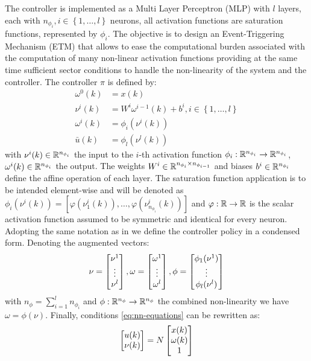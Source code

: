 \documentclass{article}
\begin{document}
The controller is implemented as a Multi Layer Perceptron (MLP) with $l$ layers, each with $n_{\phi_i}, i \in \left\{ 1, \dots, l\right\}$ neurons, all activation functions are saturation functions, represented by $\phi_i$. The objective is to design an Event-Triggering Mechanism (ETM) that allows to ease the computational burden associated with the computation of many non-linear activation functions providing at the same time sufficient sector conditions to handle the non-linearity of the system and the controller. The controller $\pi$ is defined by:
\begin{equation}\label{eq:nn-equations}
  \begin{aligned}
  \omega^{0}(k) &= x(k) \\
  \nu^{i}(k) &= W^{i} \omega^{i - 1}(k) + b^{i}, i \in \left\{ 1, \dots, l \right\}\\
  \omega^{i}(k) &= \phi_i(\nu^i(k))\\
  \bar{u}(k) &= \phi_l(\nu^l(k))
  \end{aligned} 
\end{equation}
with $\nu^i(k) \in {\mathbb{R}}^{n_{\phi_i}}$ the input to the $i$-th activation function $\phi_i: {\mathbb{R}}^{n_{\phi_i}} \to {\mathbb{R}}^{n_{\phi_i}}$, $\omega^i(k) \in {\mathbb{R}}^{n_{\phi_i}}$ the output. The weights $W^i \in {\mathbb{R}}^{n_{\phi_i} \times n_{\phi_{i-1}}}$ and biases $b^i \in {\mathbb{R}}^{n_{\phi_i}}$ define the affine operation of each layer. The saturation function application is to be intended element-wise and will be denoted as $\phi_i(\nu^i(k)) = \left[ \varphi(\nu^i_1(k)), \dots, \varphi(\nu^i_{n_{\phi_i}}(k)) \right]$ and $\varphi: {\mathbb{R}} \to {\mathbb{R}}$ is the scalar activation function assumed to be symmetric and identical for every neuron. Adopting the same notation as in \cite{css-paper} we define the controller policy in a condensed form. Denoting the augmented vectors:
\begin{equation*}
  \nu = \left[\begin{matrix}\nu^1 \\ \vdots \\ \nu^l\end{matrix}\right], \omega = \left[\begin{matrix}\omega^1 \\ \vdots \\ \omega^l\end{matrix}\right], \phi = \left[\begin{matrix}\phi_1(\nu^1) \\ \vdots \\ \phi_l(\nu^l)\end{matrix}\right] 
\end{equation*}
with $n_{\phi} = \sum_{i=1}^{l} n_{\phi_i}$ and $\phi: {\mathbb{R}}^{n_{\phi}} \to {\mathbb{R}}^{n_{\phi}}$ the combined non-linearity we have $\omega = \phi(\nu)$. Finally, conditions \ref{eq:nn-equations} can be rewritten as:
\begin{equation*}
  \left[\begin{matrix}u(k)\\ \nu(k)\end{matrix}\right] = N \left[\begin{matrix}x(k) \\ \omega(k) \\ 1\end{matrix}\right] 
\end{equation*}
\end{document}

